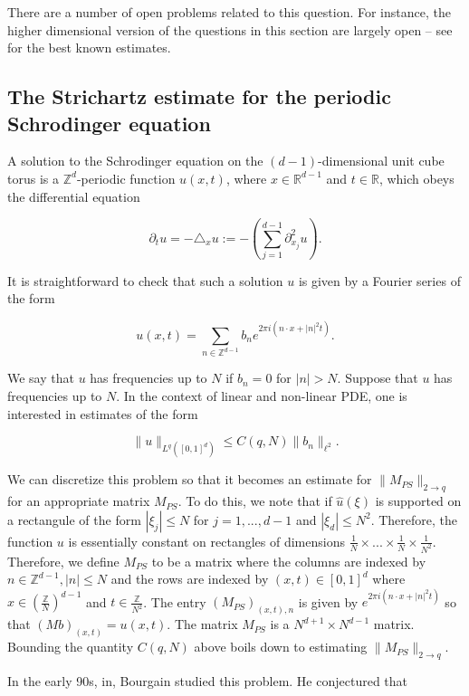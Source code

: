 \documentclass{amsart}
\newcommand{\ZZ}{\mathbb{Z}}
\newcommand{\RR}{\mathbb{R}}
\begin{document}
There are a number of open problems related to this question.  For instance, the higher dimensional version of the questions in this section are largely open -- see \cite{DZ} for the best known estimates.



\subsection{The Strichartz estimate for the periodic Schrodinger equation}

A solution to the Schrodinger equation on the $(d-1)$-dimensional unit cube torus is a $\ZZ^d$-periodic function $u(x,t)$, where $x \in \RR^{d-1}$ and $t \in \RR$, which obeys the differential equation

$$ \partial_t u = - \triangle_x u := - (\sum_{j=1}^{d-1} \partial_{x_j}^2 u). $$

\noindent It is straightforward to check that such a solution $u$ is given by a Fourier series of the form

$$ u(x,t) = \sum_{n \in \ZZ^{d-1}} b_n e^{2 \pi i (n \cdot x + |n|^2 t)}. $$

We say that $u$ has frequencies up to $N$ if $b_n = 0$ for $|n| > N$.   Suppose that $u$ has frequencies up to $N$.   In the context of linear and non-linear PDE,  one is interested in estimates of the form

$$ \| u \|_{L^q([0,1]^{d})} \le C(q,N) \| b_n \|_{\ell^2}. $$

We can discretize this problem so that it becomes an estimate for $\| M_{PS} \|_{2 \rightarrow q}$ for an appropriate matrix $M_{PS}$.   To do this,  we note that if $\hat u(\xi)$ is supported on a rectangule of the form $|\xi_j| \le N$ for $j = 1, ..., d-1$ and $|\xi_d| \le N^2$.  Therefore,  the function $u$ is essentially constant on rectangles of dimensions $\frac{1}{N} \times ... \times \frac{1}{N} \times \frac{1}{N^2}$.   Therefore,  we define $M_{PS}$ to be a matrix where the columns are indexed by $n \in \ZZ^{d-1}, |n| \le N$ and the rows are indexed by $(x,t) \in [0,1]^d$ where $x \in (\frac{\ZZ}{N})^{d-1}$ and $t \in \frac{\ZZ}{N^2}$.    The entry $(M_{PS})_{(x,t), n}$ is given by $e^{2 \pi i (n \cdot x + |n|^2 t)}$ so that $(Mb)_{(x,t)} = u(x,t)$.  
The matrix $M_{PS}$ is a $N^{d+1} \times N^{d-1}$ matrix.   Bounding the quantity $C(q,N)$ above boils down to estimating $\| M_{PS} \|_{2 \rightarrow q}$.

In the early 90s, in\cite{B4},  Bourgain studied this problem.  He conjectured that
\end{document}
